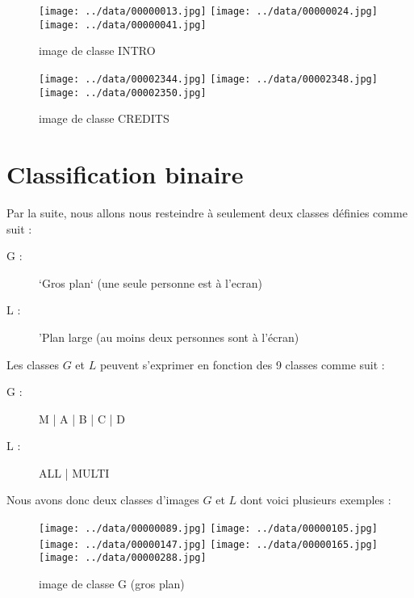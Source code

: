 \documentclass{book}
\begin{document}
\begin{figure}
\begin{center}
\texttt{[image: ../data/00000013.jpg]}
\texttt{[image: ../data/00000024.jpg]}
\texttt{[image: ../data/00000041.jpg]}
\end{center}
\caption{image de classe INTRO}
\label{classeINTRO}
\end{figure}

\begin{figure}
\begin{center}
\texttt{[image: ../data/00002344.jpg]}
\texttt{[image: ../data/00002348.jpg]}
\texttt{[image: ../data/00002350.jpg]}
\end{center}
\caption{image de classe CREDITS}
\label{classeCREDITS}
\end{figure}

\section{Classification binaire}

Par la suite, nous allons nous resteindre à seulement deux classes définies comme suit :
\begin{description} %
\item[G :] `Gros plan` (une seule personne est à l'ecran)
\item[L :] 'Plan large (au moins deux personnes sont à l'écran)
\end{description}


Les classes $G$ et $L$ peuvent s'exprimer en fonction des 9 classes comme suit :

\begin{description} %
\item[G :] M | A | B | C | D
\item[L :] ALL | MULTI
\end{description}


Nous avons donc deux classes d'images $G$ et $L$ dont voici plusieurs exemples :

\begin{figure}[H]
\begin{center}
\texttt{[image: ../data/00000089.jpg]}
\texttt{[image: ../data/00000105.jpg]}
\texttt{[image: ../data/00000147.jpg]}
\texttt{[image: ../data/00000165.jpg]}
\texttt{[image: ../data/00000288.jpg]}
\end{center}
\caption{image de classe G (gros plan)}
\label{classeG}
\end{figure}
\end{document}

